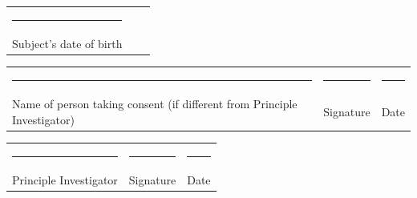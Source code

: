 \documentclass[a4paper,10pt]{article}
\begin{document}
\vspace{0.6cm}

 \begin{tabular}{p{4cm}p{4cm}p{4cm}}
    \rule{10em}{.3pt} & &  \\
     Subject's date of birth  & &  \\
 \end{tabular}

\vspace{0.6cm}

 \begin{tabular}{p{4cm}p{4cm}p{4cm}}
    \rule{10em}{.3pt} & \rule{10em}{.3pt} & \rule{10em}{.3pt} \\
     Name of person taking consent (if different from Principle Investigator) & Signature &  Date \\
\end{tabular}

\vspace{0.6cm}

 \begin{tabular}{p{4cm}p{4cm}p{4cm}}
    \rule{10em}{.3pt} & \rule{10em}{.3pt} & \rule{10em}{.3pt} \\
     Principle Investigator & Signature &  Date \\
 \end{tabular}
\end{document}
